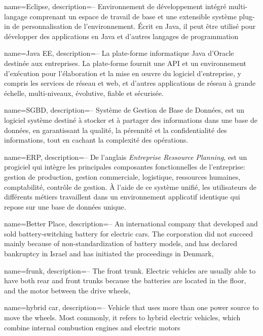 
{
  name=Eclipse,
  description={-- Environnement de développement intégré multi-langage comprenant un espace de travail de base et une extensible système plug-in de personnalisation de l'environnement. Écrit en Java, il peut être utilisé pour développer des applications en Java et d'autres langages de programmation}
}

{
  name=Java EE,
  description={-- La plate-forme informatique Java d'Oracle destinée aux entreprises. La plate-forme fournit une API et un environnement d'exécution pour l'élaboration et la mise en œuvre du logiciel d'entreprise, y compris les services de réseau et web, et d'autres applications de réseau à grande échelle, multi-niveaux, évolutive, fiable et sécurisée.}
}

{
  name=SGBD,
  description={-- Système de Gestion de Base de Données, est un logiciel système destiné à stocker et à partager des informations dans une base de données, en garantissant la qualité, la pérennité et la confidentialité des informations, tout en cachant la complexité des opérations.}
}

{
  name=ERP,
  description={-- De l'anglais \textit{Entreprise Ressource Planning}, est un progiciel qui intègre les principales composantes fonctionnelles de l'entreprise: gestion de production, gestion commerciale, logistique, ressources humaines, comptabilité, contrôle de gestion. À l'aide de ce système unifié, les utilisateurs de différents métiers travaillent dans un environnement applicatif identique qui repose sur une base de données unique. }
}

{
  name=Better Place,
  description={-- An international company that developed and sold battery-switching battery for electric cars. The corporation did not succeed mainly because of non-standardization of battery models, and has declared bankruptcy in Israel and has initiated the proceedings in Denmark},
}


{
  name=frunk,
  description={-- The front trunk. Electric vehicles are usually able to have both rear and front trunks because the batteries are located in the floor, and the motor between the drive wheels},
}

{
	name=hybrid car,
	description={-- Vehicle that uses more than one power source to move the wheels. Most commonly, it refers to hybrid electric vehicles, which combine internal combustion engines and electric motors}
}

